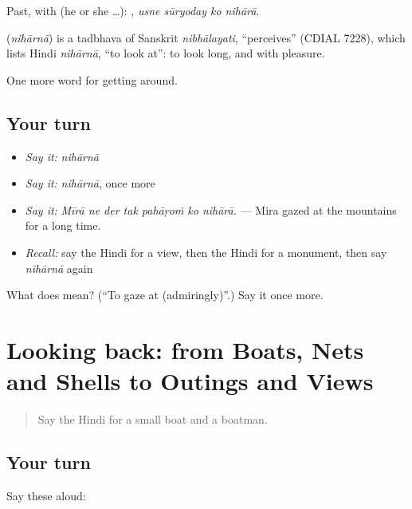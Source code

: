 Past, with  (he or she …):    , \emph{usne sūryoday ko nihārā}.

\begin{cousinweb}
\textbf{} (\emph{nihārnā}) is a tadbhava of Sanskrit \emph{nibhālayati}, \textquotedblleft{}perceives\textquotedblright{} (CDIAL 7228), which lists Hindi \emph{nihārnā}, \textquotedblleft{}to look at\textquotedblright{}: to look long, and with pleasure.
\end{cousinweb}

\begin{grammarlens}[title={What you've built}]
One more word for getting around.
\end{grammarlens}

\subsection*{Your turn}
\begin{itemize}
\raggedright
  \item \emph{Say it:} \emph{nihārnā}
  \item \emph{Say it:} \emph{nihārnā}, once more
  \item \emph{Say it:} \emph{Mīrā ne der tak pahāṛoṁ ko nihārā.} — Mira gazed at the mountains for a long time.
  \item \emph{Recall:} say the Hindi for a view, then the Hindi for a monument, then say \emph{nihārnā} again
\end{itemize}

\begin{tcolorbox}[breakable,colback=teal!4,colframe=teal!35!black,title={Before you move on}]
What does  mean? (\textquotedblleft{}To gaze at (admiringly)\textquotedblright{}.) Say it once more.
\end{tcolorbox}
\section[(dialogue)]{Looking back: from Boats, Nets and Shells to Outings and Views}

\label{lesson:HI-R451-review-445-451}



\begin{quote}
Say the Hindi for a small boat and a boatman.
\end{quote}

\subsection*{Your turn}
Say these aloud:

